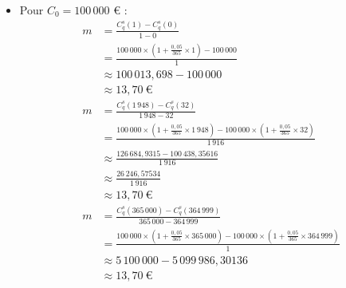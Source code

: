 \documentclass{article}
\begin{document}
\begin{enumerate}[label=\textbf{R1.\arabic*}]
\begin{itemize}
        \item Pour \( C_0 = 100\,000 \) € :
        \[
            \begin{aligned}
            m &= \frac{C^s_q(1) - C^s_q(0)}{1 - 0} \\
              &= \frac{100\,000 \times \left(1 + \frac{0{,}05}{365} \times 1\right) - 100\,000}{1} \\
              &\approx 100\,013{,}698 - 100\,000 \\
              &\approx 13{,}70\ \text{€} \\[1em]
            m &= \frac{C^s_q(1\,948) - C^s_q(32)}{1\,948 - 32} \\
              &= \frac{100\,000 \times \left(1 + \frac{0{,}05}{365} \times 1\,948\right) - 100\,000 \times \left(1 + \frac{0{,}05}{365} \times 32\right)}{1\,916} \\
              &\approx \frac{126\,684{,}9315 - 100\,438{,}35616}{1\,916} \\
              &\approx \frac{26\,246{,}57534}{1\,916} \\
              &\approx 13{,}70\ \text{€} \\[1em]
            m &= \frac{C^s_q(365\,000) - C^s_q(364\,999)}{365\,000 - 364\,999} \\
              &= \frac{100\,000 \times \left(1 + \frac{0{,}05}{365} \times 365\,000\right) - 100\,000 \times \left(1 + \frac{0{,}05}{365} \times 364\,999\right)}{1} \\
              &\approx 5\,100\,000 - 5\,099\,986,30136 \\
              &\approx 13{,}70\ \text{€}
            \end{aligned}
        \]
    

\end{itemize}
\end{enumerate}
\end{document}
